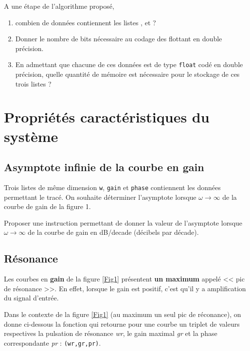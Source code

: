 \begin{tBox}
\question{} A une étape de l'algorithme proposé, 
\begin{enumerate}
\item combien de données contiennent les listes ,  et  ?
\item Donner le nombre de bits nécessaire au codage des flottant en double précision.
\item En admettant que chacune de ces données est de type \texttt{float} codé en double précision, quelle quantité de mémoire est nécessaire pour le stockage de ces trois listes ?
\end{enumerate}

\end{tBox}


\section{Propriétés caractéristiques du système}

\subsection{Asymptote infinie de la courbe en gain}

Trois listes de même dimension \texttt{w}, \texttt{gain} et \texttt{phase} contiennent les données permettant le tracé.
On souhaite déterminer l'asymptote lorsque $\omega \to \infty$ de la courbe de gain de la figure 1. 

\begin{tBox}
\question{} Proposer une instruction permettant de donner la valeur de l'asymptote lorsque $\omega \to \infty$ de la courbe de gain en dB/decade (décibels par décade).
\end{tBox}

\subsection{Résonance}

Les courbes en \textbf{gain} de la figure \ref{Fig1} présentent \textbf{un maximum} appelé << pic de résonance >>. En effet, lorsque le gain est positif, c'est qu'il y a amplification du signal d'entrée.

Dans le contexte de la figure \ref{Fig1} (au maximum un seul pic de réconance), on donne ci-dessous la fonction  qui retourne pour une courbe un triplet de valeurs respectives la pulsation de résonance \textit{wr}, le gain maximal \textit{gr} et la phase correspondante \textit{pr} : \texttt{(wr,gr,pr)}.


